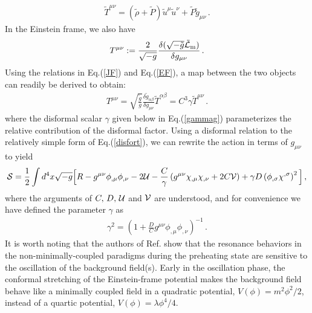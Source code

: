 \documentclass[aps,prd,amsmath,amssymb,preprintnumbers,onecolumn,11pt,nofootinbib]{revtex4}
\begin{document}
\begin{eqnarray} \label{rhop}
{\tilde T}^{\mu\nu} = \left({\tilde \rho} + {\tilde P}\right){\tilde u}^{\mu}{\tilde u}^{\nu} +{\tilde P}{\tilde g}_{\mu\nu}\,.
\end{eqnarray}
In the Einstein frame, we also have 
\begin{eqnarray} \label{EF}
T^{\mu\nu} := \frac{2}{\sqrt{-g}}\frac{\delta(\sqrt{-\tilde{g}}{\tilde {\cal L}}_{\rm m})}{\delta g_{\mu\nu}}\,.
\end{eqnarray}
Using the relations in Eq.(\ref{JF}) and Eq.(\ref{EF}), a map between the two objects can readily be derived to obtain:
\begin{eqnarray} \label{EFJF}
T^{\mu\nu} = \sqrt{\frac{\tilde g}{g}}\frac{\delta {\tilde g}_{\alpha\beta}}{\delta g_{\mu\nu}}{\tilde T}^{\alpha\beta} = C^{3}\gamma {\tilde T}^{\mu\nu}\,.
\end{eqnarray}
where the disformal scalar $\gamma$ given below in Eq.(\ref{gammag}) parameterizes the relative contribution of the disformal factor. Using a disformal relation to the relatively simple form of Eq.(\ref{disfort}), we can rewrite the action in terms of $g_{\mu\nu}$ to yield \cite{vandeBruck:2015tna}
\begin{eqnarray} \label{pureg}
{\cal S} = \frac{1}{2}\int d^{4}x\sqrt{-g}\Big[R - g^{\mu\nu}\phi_{,\mu}\phi_{,\nu} - 2{\cal U} - \frac{C}{\gamma}\left(g^{\mu\nu}\chi_{,\mu}\chi_{,\nu}+ 2C{\cal V}\right) + \gamma D \left(\phi_{,\sigma}\chi^{,\sigma}\right)^{2}\Big]\,,
\end{eqnarray}
where the arguments of $C,\,D,\,{\cal U}$ and ${\cal V}$ are understood, and for convenience we have defined the parameter $\gamma$ as
\begin{eqnarray} \label{gammag}
\gamma^{2} = \left(1 + \frac{D}{C}g^{\mu\nu}\phi_{,\mu}\phi_{,\nu}\right)^{-1}\,.
\end{eqnarray}
It is worth noting that the authors of Ref.\cite{DeCross:2015uza} show that the resonance behaviors in the non-minimally-coupled paradigms during the preheating state are sensitive to the oscillation of the background field(s). Early in the oscillation phase, the conformal stretching of the Einstein-frame potential makes the background field behave like a minimally coupled field in a quadratic potential, $V(\phi)=m^{2}\phi^{2}/2$, instead of a quartic potential, $V(\phi)=\lambda\phi^{4}/4$. 
\end{document}
